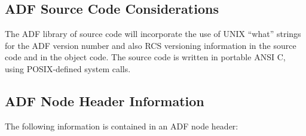 \subsection{ADF Source Code Considerations}

The ADF library of source code will incorporate the use of UNIX ``what''
strings for the ADF version number and also RCS versioning information
in the source code and in the object code.
The source code is written in portable ANSI C, using POSIX-defined system
calls.

\subsection{ADF Node Header Information}

The following information is contained in an ADF node header:

